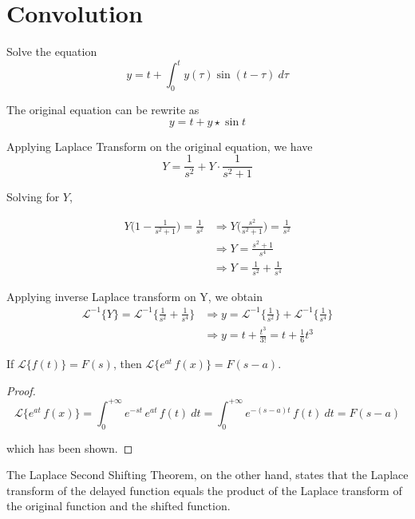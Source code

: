 \section{Convolution}

\begin{example}
    Solve the equation 
    \[
        y = t + \int_{0}^{t} y(\tau) \sin(t - \tau) \> d\tau
    \]
\end{example}
\begin{solution}
    The original equation can be rewrite as 
    \[
        y = t + y \star \sin t
    \]

    Applying Laplace Transform on the original equation, we have 
    \[
        Y = \frac{1}{s^2} + Y \cdot \frac{1}{s^2 + 1}
    \]

    Solving for $Y$, 

    \begin{align*}
        Y \biggl(1 - \frac{1}{s^2 + 1}\biggr) = \frac{1}{s^2} &\Rightarrow 
        Y \biggl(\frac{s^2}{s^2 + 1}\biggr) = \frac{1}{s^2}\\
        &\Rightarrow Y = \frac{s^2 + 1}{s^4}\\
        &\Rightarrow Y = \frac{1}{s^2} + \frac{1}{s^4}
    \end{align*}

    Applying inverse Laplace transform on Y, we obtain
    \begin{align*}
        \mathcal{L}^{-1}\{Y\} = \mathcal{L}^{-1} \biggl\{\frac{1}{s^2} + \frac{1}{s^4}\biggr\} &\Rightarrow 
        y = \mathcal{L}^{-1}\biggl\{\frac{1}{s^2}\biggr\} + \mathcal{L}^{-1}\biggl\{\frac{1}{s^4}\biggr\}\\
        &\Rightarrow y = t + \frac{t^3}{3!} = t + \frac{1}{6}t^3
    \end{align*}
\end{solution}

\begin{theorem}
    If $\mathcal{L}\{f(t) \} = F(s)$, then $\mathcal{L}\{e^{at} \, f(x)\} = F(s-a)$.
\end{theorem}
\begin{proof}
    \[
        \mathcal{L}\{e^{at} \, f(x)\} = \int_{0}^{+\infty} e^{-st}\, e^{at}\, f(t)\> dt = \int_{0}^{+\infty} e^{-(s-a)t}\, f(t)\> dt = F(s-a)
    \]

    which has been shown.
\end{proof}

The Laplace Second Shifting Theorem, on the other hand, states that the
 Laplace transform of the delayed function
 equals the product of the Laplace transform of the original function and the shifted function.

